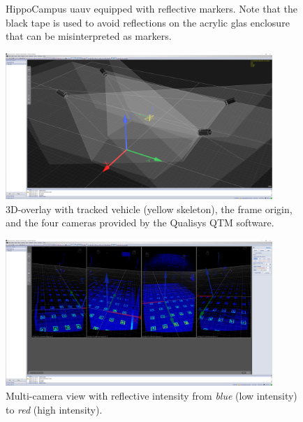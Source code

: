 \begin{figure}
    \centering
    
    \caption{HippoCampus \ac{uauv} equipped with reflective markers. Note that the black tape is used to avoid reflections on the acrylic glas enclosure that can be misinterpreted as markers.}
    \label{fig:hippo_with_marker}
\end{figure}


\begin{figure}
    \centering
    \includegraphics[width=0.9\textwidth]{images/04/qtm_3d_overlay.png}
    \caption{3D-overlay with tracked vehicle (yellow skeleton), the frame origin, and the four cameras provided by the Qualisys QTM software.}
    \label{fig:qtm_3d}
\end{figure}

\begin{figure}
    \centering
    \includegraphics[width=0.9\textwidth]{images/04/qtm_multi_cam_intensity.png}
    \caption{Multi-camera view with reflective intensity from \textit{blue} (low intensity) to \textit{red} (high intensity).}
    \label{fig:qtm_intensity}
\end{figure}


